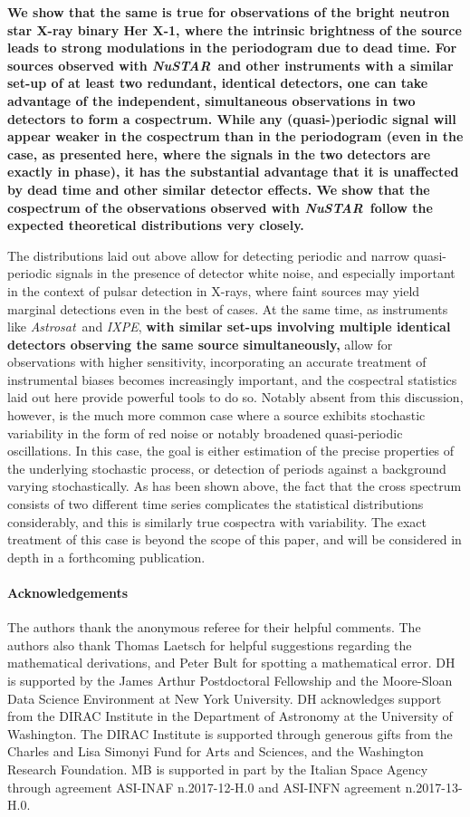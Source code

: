 \documentclass[12pt]{emulateapj}
\newcommand{\project}[1]{\textsl{#1}}
\newcommand{\nustar}{\project{NuSTAR}\xspace}
\newcommand{\astrosat}{\project{Astrosat}\xspace}
\newcommand{\ixpe}{\project{IXPE}\xspace}
\begin{document}
\textbf{We show that the same is true for observations of the bright neutron star X-ray binary Her X-1, where the intrinsic brightness of the source leads to strong modulations in the periodogram due to dead time. For sources observed with \nustar\ and other instruments with a similar set-up of at least two redundant, identical detectors, one can take advantage of the independent, simultaneous observations in two detectors to form a cospectrum. While any (quasi-)periodic signal will appear weaker in the cospectrum than in the periodogram (even in the case, as presented here, where the signals in the two detectors are exactly in phase), it has the substantial advantage that it is unaffected by dead time and other similar detector effects. We show that the cospectrum of the observations observed with \nustar\ follow the expected theoretical distributions very closely.}

The distributions laid out above allow for detecting periodic and narrow quasi-periodic signals in the presence of detector white noise, and especially important in the context of pulsar detection in X-rays, where faint sources may yield marginal detections even in the best of cases. At the same time, as instruments like \astrosat\ and \ixpe, \textbf{with similar set-ups involving multiple identical detectors observing the same source simultaneously,} allow for observations with higher sensitivity, incorporating an accurate treatment of instrumental biases becomes increasingly important, and the cospectral statistics laid out here provide powerful tools to do so.
Notably absent from this discussion, however, is the much more common case where a source exhibits stochastic variability in the form of red noise or notably broadened quasi-periodic oscillations. In this case, the goal is either estimation of the precise properties of the underlying stochastic process, or detection of periods against a background varying stochastically. As has been shown above, the fact that the cross spectrum consists of two different time series complicates the statistical distributions considerably, and this is similarly true cospectra with variability. The exact treatment of this case is beyond the scope of this paper, and will be considered in depth in a forthcoming publication. 


\paragraph{Acknowledgements}
The authors thank the anonymous referee for their helpful comments.
The authors also thank Thomas Laetsch for helpful suggestions regarding the mathematical derivations, and Peter Bult for spotting a mathematical error.
DH is supported by the James Arthur Postdoctoral Fellowship and the Moore-Sloan Data Science Environment at New York University. 
DH acknowledges support from the DIRAC Institute in the Department of Astronomy at the University of Washington. The DIRAC Institute is supported through generous gifts from the Charles and Lisa Simonyi Fund for Arts and Sciences, and the Washington Research Foundation.
MB is supported in part by the Italian Space Agency through agreement ASI-INAF n.2017-12-H.0 and ASI-INFN agreement n.2017-13-H.0.
\end{document}
